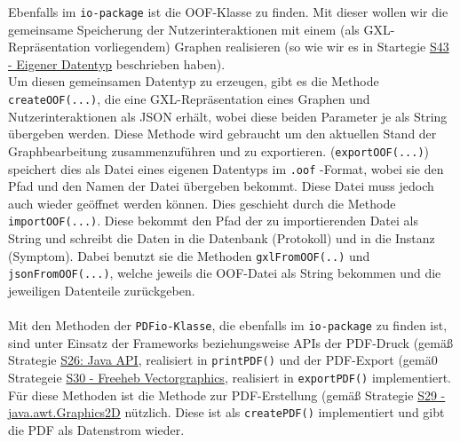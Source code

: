 \documentclass[enabledeprecatedfontcommands,fontsize=11pt,paper=a4,twoside]{scrartcl}
\newcounter{one}
\begin{document}
Ebenfalls im \texttt{io-package} ist die OOF-Klasse zu finden. Mit dieser wollen wir die gemeinsame Speicherung der Nutzerinteraktionen mit einem (als GXL-Repräsentation vorliegendem) Graphen realisieren (so wie wir es in Startegie \hyperlink{ooo}{S43 - Eigener Datentyp} beschrieben haben). \\
Um diesen gemeinsamen Datentyp zu erzeugen, gibt es die Methode \texttt{createOOF(...)}, die eine GXL-Repräsentation eines Graphen und Nutzerinteraktionen als JSON erhält, wobei diese beiden Parameter je als String übergeben werden. Diese Methode wird gebraucht um den aktuellen Stand der Graphbearbeitung zusammenzuführen und zu exportieren. (\texttt{exportOOF(...)}) speichert dies als Datei eines eigenen Datentyps im \texttt{.oof} -Format, wobei sie den Pfad und den Namen der Datei übergeben bekommt. Diese Datei muss jedoch auch wieder geöffnet werden können. Dies geschieht durch die Methode \texttt{importOOF(...)}. Diese bekommt den Pfad der zu importierenden Datei als String und schreibt die Daten in die Datenbank (Protokoll) und in die Instanz (Symptom). Dabei benutzt sie die Methoden \texttt{gxlFromOOF(..)} und \texttt{jsonFromOOF(...)}, welche jeweils die OOF-Datei als String bekommen und die jeweiligen Datenteile zurückgeben. \\ \\

Mit den Methoden der \texttt{PDFio-Klasse}, die ebenfalls im \texttt{io-package} zu finden ist, sind unter Einsatz der Frameworks beziehungsweise APIs der PDF-Druck (gemäß Strategie \hyperlink{ggg}{S26: Java API}, realisiert in \texttt{printPDF()} und der PDF-Export (gemä0 Strategeie \hyperlink{iii}{S30 - Freeheb Vectorgraphics}, realisiert in \texttt{exportPDF()} implementiert. Für diese Methoden ist die Methode zur PDF-Erstellung (gemäß Strategie \hyperlink{hhh}{S29 - java.awt.Graphics2D} nützlich. Diese ist als \texttt{createPDF()} implementiert und gibt die PDF als Datenstrom wieder. \\ \\ \\
\end{document}

